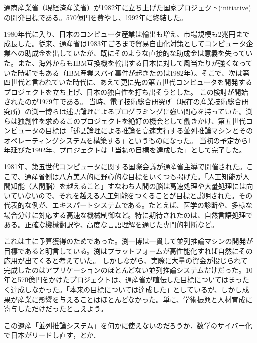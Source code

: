 \documentclass[uplatex, 12pt, dvipdfmx]{jsreport}
\begin{document}
\begin{history}
    通商産業省（現経済産業省）が1982年に立ち上げた国家プロジェクト(initiative)の開発目標である。570億円を費やし、1992年に終結した。

    1980年代に入り、日本のコンピュータ産業は輸出も増え、市場規模も2兆円まで成長した。従来、通産省は1983年ごろまで貿易自由化対策としてコンピュータ企業への助成金を出していたが、既にそのような直接的な助成金は意義を失っていた。また、海外からもIBM互換機を輸出する日本に対して風当たりが強くなっていた時期でもある（IBM産業スパイ事件が起きたのは1982年）。そこで、次は第四世代と言われていた時代に、あえて更に先の第五世代コンピュータを開発するプロジェクトを立ち上げ、日本の独自性を打ち出そうとした。
    この検討が開始されたのが1979年である。
    当時、電子技術総合研究所（現在の産業技術総合研究所）の渕一博らは述語論理によるプログラミングに強い関心を持っていた。渕らは独創性を求めるこのプロジェクトを絶好の機会として働きかけ、第五世代コンピュータの目標は「述語論理による推論を高速実行する並列推論マシンとそのオペレーティングシステムを構築する」というものになった。
    当初の予定から1年延びた1992年、プロジェクトは「当初の目標を達成した」として完了した。
\end{history}
\begin{remark}[この時代の日本ぶいぶい言わせすぎじゃないか？？]
    1981年、第五世代コンピュータに関する国際会議が通産省主導で開催された。ここで、通産省側は八方美人的に野心的な目標をいくつも掲げた。「人工知能が人間知能（人間脳）を越えること」すなわち人間の脳は高速処理や大量処理には向いていないので、それを越える人工知能をつくることが目標と説明された。その代表的な例が、エキスパートシステムである。たとえば、医学の診断や、多様な場合分けに対応する高速な機械制御など。特に期待されたのは、自然言語処理である。正確な機械翻訳や、高度な言語理解を通じた専門的判断など。

    これは主に予算獲得のためであった。渕一博は一貫して並列推論マシンの開発が目標であると明言している。渕はプラットフォームが高性能化すれば自然にその応用が出てくると考えていた。
    しかしながら、実際に大量の資金が投じられて完成したのはアプリケーションのほとんどない並列推論システムだけだった。10年と570億円をかけたプロジェクトは、通産省が喧伝した目標についてはまったく達成しなかった。「本来の目標については達成した」としているが、しかし成果が産業に影響を与えることはほとんどなかった。単に、学術振興と人材育成に寄与しただけだったと言えよう。
\end{remark}
この遺産「並列推論システム」を何かに使えないのだろうか．数学のサイバー化で日本がリードし直す，とか．
\end{document}
